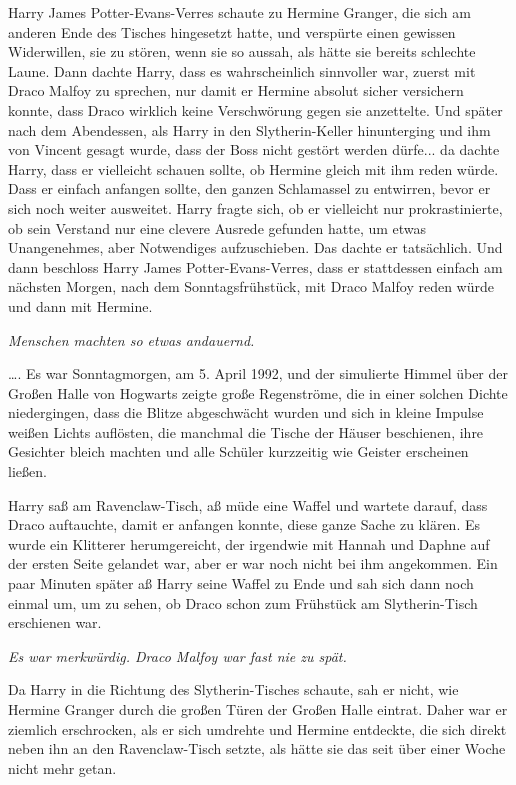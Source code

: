 Harry James Potter-Evans-Verres schaute zu Hermine Granger, die sich am anderen
Ende des Tisches hingesetzt hatte, und verspürte einen gewissen Widerwillen, sie
zu stören, wenn sie so aussah, als hätte sie bereits schlechte Laune. Dann
dachte Harry, dass es wahrscheinlich sinnvoller war, zuerst mit Draco Malfoy zu
sprechen, nur damit er Hermine absolut sicher versichern konnte, dass Draco
wirklich keine Verschwörung gegen sie anzettelte. Und später nach dem
Abendessen, als Harry in den Slytherin-Keller hinunterging und ihm von Vincent
gesagt wurde, dass der Boss nicht gestört werden dürfe... da dachte Harry, dass
er vielleicht schauen sollte, ob Hermine gleich mit ihm reden würde. Dass er
einfach anfangen sollte, den ganzen Schlamassel zu entwirren, bevor er sich noch
weiter ausweitet. Harry fragte sich, ob er vielleicht nur prokrastinierte, ob
sein Verstand nur eine clevere Ausrede gefunden hatte, um etwas Unangenehmes,
aber Notwendiges aufzuschieben. Das dachte er tatsächlich. Und dann beschloss
Harry James Potter-Evans-Verres, dass er stattdessen einfach am nächsten Morgen,
nach dem Sonntagsfrühstück, mit Draco Malfoy reden würde und dann mit Hermine.

\emph{Menschen machten so etwas andauernd. }

…. Es war Sonntagmorgen, am 5. April 1992, und der simulierte Himmel über der
Großen Halle von Hogwarts zeigte große Regenströme, die in einer solchen Dichte
niedergingen, dass die Blitze abgeschwächt wurden und sich in kleine Impulse
weißen Lichts auflösten, die manchmal die Tische der Häuser beschienen, ihre
Gesichter bleich machten und alle Schüler kurzzeitig wie Geister erscheinen
ließen.

Harry saß am Ravenclaw-Tisch, aß müde eine Waffel und wartete darauf, dass Draco
auftauchte, damit er anfangen konnte, diese ganze Sache zu klären. Es wurde ein
Klitterer herumgereicht, der irgendwie mit Hannah und Daphne auf der ersten
Seite gelandet war, aber er war noch nicht bei ihm angekommen. Ein paar Minuten
später aß Harry seine Waffel zu Ende und sah sich dann noch einmal um, um zu
sehen, ob Draco schon zum Frühstück am Slytherin-Tisch erschienen war.

\emph{Es war merkwürdig. Draco Malfoy war fast nie zu spät. }

Da Harry in die Richtung des Slytherin-Tisches schaute, sah er nicht, wie
Hermine Granger durch die großen Türen der Großen Halle eintrat. Daher war er
ziemlich erschrocken, als er sich umdrehte und Hermine entdeckte, die sich
direkt neben ihn an den Ravenclaw-Tisch setzte, als hätte sie das seit über
einer Woche nicht mehr getan.

